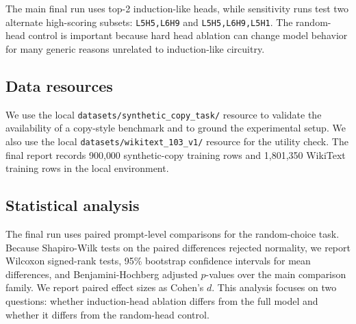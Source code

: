 The main final run uses top-2 induction-like heads, while sensitivity runs test two alternate high-scoring subsets: \texttt{L5H5,L6H9} and \texttt{L5H5,L6H9,L5H1}. The random-head control is important because hard head ablation can change model behavior for many generic reasons unrelated to induction-like circuitry.

\subsection{Data resources}
\label{sec:data}

We use the local \texttt{datasets/synthetic\_copy\_task/} resource to validate the availability of a copy-style benchmark and to ground the experimental setup. We also use the local \texttt{datasets/wikitext\_103\_v1/} resource for the utility check. The final report records 900{,}000 synthetic-copy training rows and 1{,}801{,}350 WikiText training rows in the local environment.

\subsection{Statistical analysis}
\label{sec:statistics}

The final run uses paired prompt-level comparisons for the random-choice task. Because Shapiro-Wilk tests on the paired differences rejected normality, we report Wilcoxon signed-rank tests, 95\% bootstrap confidence intervals for mean differences, and Benjamini-Hochberg adjusted $p$-values over the main comparison family. We report paired effect sizes as Cohen's $d$. This analysis focuses on two questions: whether induction-head ablation differs from the full model and whether it differs from the random-head control.

